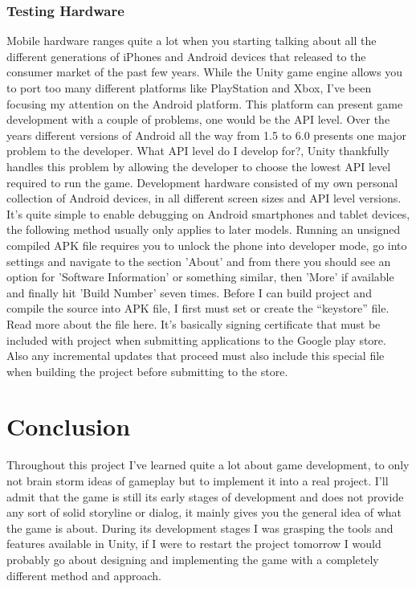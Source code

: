 \subsection{Testing Hardware}
Mobile hardware ranges quite a lot when you starting talking about all the different generations of iPhones and Android devices that released to the consumer market of the past few years. While the Unity game engine allows you to port too many different platforms like PlayStation and Xbox, I’ve been focusing my attention on the Android platform. This platform can present game development with a couple of problems, one would be the API level. Over the years different versions of Android all the way from 1.5 to 6.0 presents one major problem to the developer. What API level do I develop for?, Unity thankfully handles this problem by allowing the developer to choose the lowest API level required to run the game.
Development hardware consisted of my own personal collection of Android devices, in all different screen sizes and API level versions. It’s quite simple to enable debugging on Android smartphones and tablet devices, the following method usually only applies to later models. Running an unsigned compiled APK file requires you to unlock the phone into developer mode, go into settings and navigate to the section 'About' and from there you should see an option for 'Software Information' or something similar, then 'More' if available and finally hit 'Build Number' seven times. Before I can build project and compile the source into APK file, I first must set or create the “keystore” file. Read more about the file here. It’s basically signing certificate that must be included with project when submitting applications to the Google play store. Also any incremental updates that proceed must also include this special file when building the project before submitting to the store.

\chapter{Conclusion}
Throughout this project I've learned quite a lot about game development, to only not brain storm ideas of gameplay but to implement it into a real project. I'll admit that the game is still its early stages of development and does not provide any sort of solid storyline or dialog, it mainly gives you the general idea of what the game is about. During its development stages I was grasping the tools and features available in Unity, if I were to restart the project tomorrow I would probably go about designing and implementing the game with a completely different method and approach.

